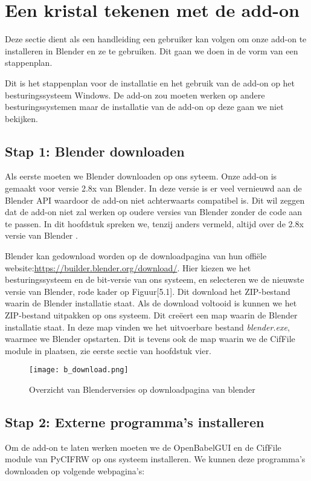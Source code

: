 \section{Een kristal tekenen met de add-on}
Deze sectie dient als een handleiding een gebruiker kan volgen om onze add-on te installeren in Blender en ze te gebruiken. Dit gaan we doen in de vorm van een stappenplan. 
\par
Dit is het stappenplan voor de installatie en het gebruik van de add-on op het besturingssysteem Windows. De add-on zou moeten werken op andere besturingssystemen maar de installatie van de add-on op deze gaan we niet bekijken. 

\subsection{Stap 1: Blender downloaden}
Als eerste moeten we Blender downloaden op ons syteem. Onze add-on is gemaakt voor versie 2.8x van Blender. In deze versie is er veel vernieuwd aan de Blender API waardoor de add-on niet achterwaarts compatibel is. Dit wil zeggen dat de add-on niet zal werken op oudere versies van Blender zonder de code aan te passen. In dit hoofdstuk spreken we, tenzij anders vermeld, altijd over de 2.8x versie van Blender .  
\par
Blender kan gedownload worden op de downloadpagina van hun offiële website:\url{https://builder.blender.org/download/}. Hier kiezen we het besturingssysteem en de bit-versie van ons systeem, en selecteren we de nieuwste versie van Blender, rode kader op Figuur[5.1].  Dit download het ZIP-bestand waarin de Blender installatie staat. Als de download voltooid is kunnen we het ZIP-bestand uitpakken op ons systeem. Dit creëert een map waarin de Blender installatie staat. In deze map vinden we het uitvoerbare bestand \textit{blender.exe}, waarmee we Blender opstarten. Dit is tevens ook de map waarin we de CifFile module in plaatsen, zie eerste sectie van hoofdstuk vier.      

\begin{figure}[h]
\begin{center}
\texttt{[image: b\_download.png]}
\caption{Overzicht van Blenderversies op downloadpagina van blender}
\end{center}
\end{figure}
 
\subsection{Stap 2: Externe programma's installeren}
Om de add-on te laten werken moeten we de OpenBabelGUI en de CifFile module van PyCIFRW op ons systeem installeren. We kunnen deze programma's downloaden op volgende webpagina's:

